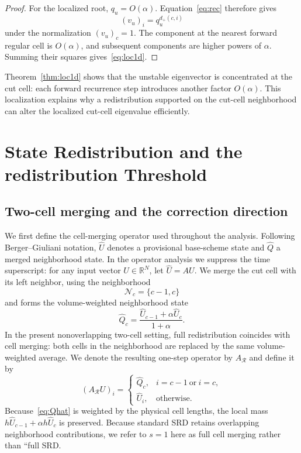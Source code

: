 \documentclass[preprint,12pt]{elsarticle}
\begin{document}
\begin{proof}
For the localized root, $q_u=O(\alpha)$.  Equation~\eqref{eq:rec} therefore
gives
\[
    (v_u)_i=q_u^{d_+(c,i)}
\]
under the normalization $(v_u)_c=1$.  The component at the nearest forward regular cell is $O(\alpha)$, and
subsequent components are higher powers of $\alpha$.
Summing their squares gives~\eqref{eq:loc1d}.
\end{proof}

Theorem~\ref{thm:loc1d} shows that the unstable eigenvector is concentrated at
the cut cell: each forward recurrence step introduces another factor
$O(\alpha)$.  This localization explains why a redistribution supported on the
cut-cell neighborhood can alter the localized cut-cell eigenvalue efficiently.

\section{State Redistribution and the redistribution Threshold}
\label{sec:stabilization}

\subsection{Two-cell merging and the correction direction}
\label{sec:align}

We first define the cell-merging operator used throughout the analysis.
Following Berger--Giuliani notation, $\widehat U$ denotes a provisional
base-scheme state and $\widehat Q$ a merged neighborhood state.  In the
operator analysis we suppress the time superscript: for any input vector
$U\in\mathbb R^N$, let $\widehat U=AU$.  We merge the cut cell with its
left neighbor, using the neighborhood
\[
    \mathcal N_c=\{c-1,c\}
\]
and forms the volume-weighted neighborhood state
\begin{equation}
    \widehat Q_c
    =
    \frac{\widehat U_{c-1}+\alpha\widehat U_c}{1+\alpha}.
    \label{eq:Qhat}
\end{equation}
In the present nonoverlapping two-cell setting, full redistribution coincides
with cell merging: both cells in the neighborhood are replaced by the same
volume-weighted average.  We denote the resulting one-step operator by
$A_{\mathcal R}$ and define it by
\begin{equation}
 (A_{\mathcal R}U)_i=
 \begin{cases}
     \widehat Q_c, & i=c-1\ \text{or}\ i=c,\\
     \widehat U_i, & \text{otherwise}.
 \end{cases}
 \label{eq:Asrd-def}
\end{equation}
Because~\eqref{eq:Qhat} is weighted by the physical cell lengths, the local
mass $h\widehat U_{c-1}+\alpha h\widehat U_c$ is preserved.  Because standard SRD retains overlapping neighborhood
contributions, we refer to $s=1$ here as full cell merging rather than ``full
SRD.
\end{document}
